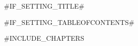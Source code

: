 \documentclass[12pt, paper=a4, parskip, oneside]{scrreprt}
\begin{document}
#IF_SETTING_TITLE#\maketitle

#IF_SETTING_TABLEOFCONTENTS#\tableofcontents %

#INCLUDE_CHAPTERS

\printbibliography
\end{document}
